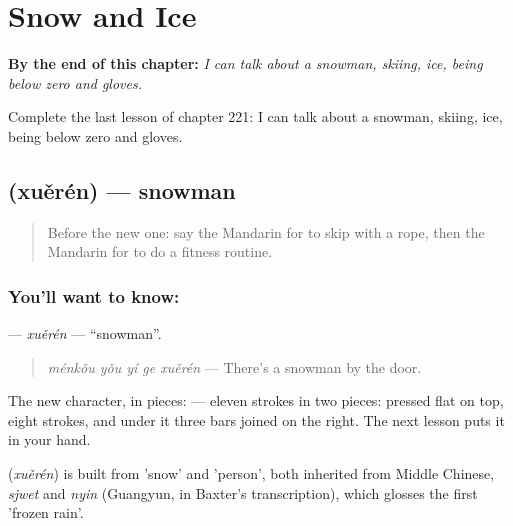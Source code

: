 
\chapter{Snow and Ice}
\label{ch:zh-snow-and-ice}

\begin{chapteropening}
\textbf{By the end of this chapter:} \emph{I can talk about a snowman, skiing, ice, being below zero and gloves.}

Complete the last lesson of chapter 221: I can talk about a snowman, skiing, ice, being below zero and gloves.
\end{chapteropening}

\section[\texorpdfstring{\zh{雪人} (xuěrén)}{雪人 (xuěrén)}]{ (xuěrén) — snowman}

\label{lesson:ZH-C221-xueren}



\begin{quote}
Before the new one: say the Mandarin for to skip with a rope, then the Mandarin for to do a fitness routine.
\end{quote}

\subsection*{You'll want to know: }
\textbf{} — \emph{xuěrén} — \textquotedblleft{}snowman\textquotedblright{}.

\begin{quote}
\textbf{} \emph{ménkǒu yǒu yí ge xuěrén} — There's a snowman by the door.
\end{quote}

The new character, in pieces:  — eleven strokes in two pieces:  pressed flat on top, eight strokes, and under it three bars joined on the right. The next lesson puts it in your hand.

\begin{cousinweb}
\textbf{} (\emph{xuěrén}) is built from  'snow' and  'person', both inherited from Middle Chinese, \emph{sjwet} and \emph{nyin} (Guangyun, in Baxter's transcription), which glosses the first 'frozen rain'.
\end{cousinweb}

